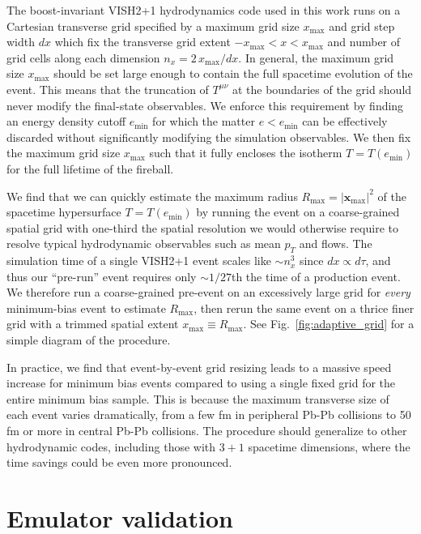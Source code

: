 \documentclass[aps,prc,reprint,amsmath,nofootinbib]{revtex4-1}
\newcommand{\xv}{\mathbf x}
\begin{document}
The boost-invariant VISH2+1 hydrodynamics code used in this work \cite{Song:2007ux, Shen:2014vra} runs on a Cartesian transverse grid specified by a maximum grid size $x_\text{max}$ and grid step width $dx$ which fix the transverse grid extent ${-x_\text{max} < x < x_\text{max}}$ and number of grid cells along each dimension ${n_x = 2\, x_\text{max} / dx}$.
In general, the maximum grid size $x_\text{max}$ should be set large enough to contain the full spacetime evolution of the event.
This means that the truncation of $T^{\mu\nu}$ at the boundaries of the grid should never modify the final-state observables.
We enforce this requirement by finding an energy density cutoff $e_\text{min}$ for which the matter $e < e_\text{min}$ can be effectively discarded without significantly modifying the simulation observables.
We then fix the maximum grid size $x_\text{max}$ such that it fully encloses the isotherm $T=T(e_\text{min})$ for the full lifetime of the fireball.

We find that we can quickly estimate the maximum radius $R_\text{max} = |\xv_\text{max}|^2$ of the spacetime hypersurface ${T = T(e_\text{min})}$ by running the event on a coarse-grained spatial grid with one-third the spatial resolution we would otherwise require to resolve typical hydrodynamic observables such as mean $p_T$ and flows.
The simulation time of a single VISH2+1 event scales like ${\sim}n_x^3$ since $dx \propto d\tau$, and thus our ``pre-run'' event requires only ${\sim}1/27$th the time of a production event.
We therefore run a coarse-grained pre-event on an excessively large grid for \emph{every} minimum-bias event to estimate $R_\text{max}$, then rerun the same event on a thrice finer grid with a trimmed spatial extent $x_\text{max} \equiv R_\text{max}$.
See Fig.~\ref{fig:adaptive_grid} for a simple diagram of the procedure.

In practice, we find that event-by-event grid resizing leads to a massive speed increase for minimum bias events compared to using a single fixed grid for the entire minimum bias sample.
This is because the maximum transverse size of each event varies dramatically, from a few fm in peripheral Pb-Pb collisions to 50 fm or more in central Pb-Pb collisions.
The procedure should generalize to other hydrodynamic codes, including those with $3+1$ spacetime dimensions, where the time savings could be even more pronounced.


\section{Emulator validation}
\label{app:validation}
\end{document}
